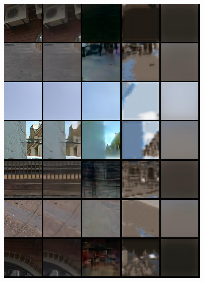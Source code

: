 \begin{appendices}
\begin{figure}
    \includegraphics[width=0.92\textwidth]{figures/ptz/test_stacked_4}
\end{figure}

\end{appendices}